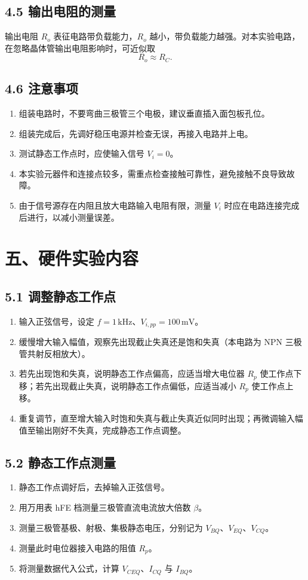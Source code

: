 \documentclass[a4paper,12pt]{article}
\begin{document}
\subsection*{4.5 输出电阻的测量}
输出电阻 $R_o$ 表征电路带负载能力，$R_o$ 越小，带负载能力越强。对本实验电路，在忽略晶体管输出电阻影响时，可近似取
\[
R_o \approx R_C.
\]

\subsection*{4.6 注意事项}
\begin{enumerate}
    \item 组装电路时，不要弯曲三极管三个电极，建议垂直插入面包板孔位。
    \item 组装完成后，先调好稳压电源并检查无误，再接入电路并上电。
    \item 测试静态工作点时，应使输入信号 $V_i=0$。
    \item 本实验元器件和连接点较多，需重点检查接触可靠性，避免接触不良导致故障。
    \item 由于信号源存在内阻且放大电路输入电阻有限，测量 $V_i$ 时应在电路连接完成后进行，以减小测量误差。
\end{enumerate}

\section*{五、硬件实验内容}
\subsection*{5.1 调整静态工作点}
\begin{enumerate}
    \item 输入正弦信号，设定 $f=1\,\mathrm{kHz}$、$V_{i,pp}=100\,\mathrm{mV}$。
    \item 缓慢增大输入幅值，观察先出现截止失真还是饱和失真（本电路为 NPN 三极管共射反相放大）。
    \item 若先出现饱和失真，说明静态工作点偏高，应适当增大电位器 $R_p$ 使工作点下移；若先出现截止失真，说明静态工作点偏低，应适当减小 $R_p$ 使工作点上移。
    \item 重复调节，直至增大输入时饱和失真与截止失真近似同时出现；再微调输入幅值至输出刚好不失真，完成静态工作点调整。
\end{enumerate}


\subsection*{5.2 静态工作点测量}
\begin{enumerate}
    \item 静态工作点调好后，去掉输入正弦信号。
    \item 用万用表 hFE 档测量三极管直流电流放大倍数 $\beta$。
    \item 测量三极管基极、射极、集极静态电压，分别记为 $V_{BQ}$、$V_{EQ}$、$V_{CQ}$。
    \item 测量此时电位器接入电路的阻值 $R_p$。
    \item 将测量数据代入公式，计算 $V_{CEQ}$、$I_{CQ}$ 与 $I_{BQ}$。
\end{enumerate}
\end{document}
